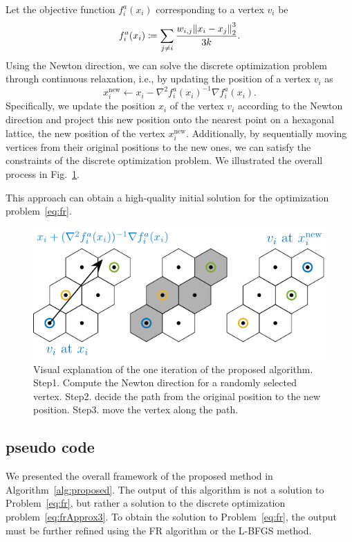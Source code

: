 \documentclass[dvipdfmx,journal]{IEEEtran}
\newcommand{\defeq}{\coloneqq}
\begin{document}
Let the objective function $f^a_i(x_i)$ corresponding to a vertex $v_i$ be
\begin{equation*}
  f^a_i(x_i) \defeq \sum_{j \neq i} \frac{w_{i,j}\norm{x_i - x_j}_2^3}{3k}.
\end{equation*}
Using the Newton direction, we can solve the discrete optimization problem through continuous relaxation, i.e., by updating the position of a vertex $v_i$ as
\begin{equation*}
  x_i^\mathrm{new} \gets x_i - \nabla^2 f^a_i(x_i)^{-1} \nabla f^a_i(x_i).
\end{equation*}
Specifically, we update the position $x_i$ of the vertex $v_i$ according to the Newton direction and project this new position onto the nearest point on a hexagonal lattice, the new position of the vertex $x_i^\mathrm{new}$.
Additionally, by sequentially moving vertices from their original positions to the new ones, we can satisfy the constraints of the discrete optimization problem. We illustrated the overall process in Fig.~\ref{fig:hex}.

This approach can obtain a high-quality initial solution for the optimization problem~\eqref{eq:fr}.

\begin{figure}[t]
  \centering
  \includegraphics[width=\columnwidth]{hex/hex.pdf}
  \caption{Visual explanation of the one iteration of the proposed algorithm. Step1. Compute the Newton direction for a randomly selected vertex. Step2. decide the path from the original position to the new position. Step3. move the vertex along the path.}
  \label{fig:hex}
\end{figure}

\subsection{pseudo code}\label{ssec:pseudoCode}

We presented the overall framework of the proposed method in Algorithm~\ref{alg:proposed}.
The output of this algorithm is not a solution to Problem~\eqref{eq:fr}, but rather a solution to the discrete optimization problem~\eqref{eq:frApprox3}.
To obtain the solution to Problem~\eqref{eq:fr}, the output must be further refined using the FR algorithm or the L-BFGS method.
\end{document}
